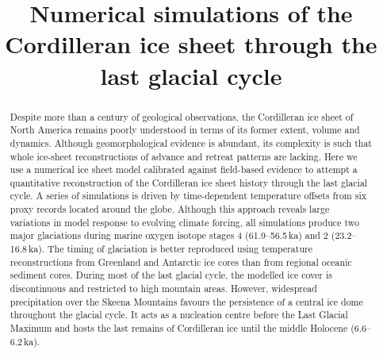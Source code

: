 \documentclass[tc, manuscript]{copernicus}
\begin{document}
\hack{\sloppy}


\title{Numerical simulations of the Cordilleran ice sheet
       through the last glacial cycle}







\hack{\allowdisplaybreaks}

\published{}


\maketitle


\begin{abstract}
Despite more than a century of geological observations, the
Cordilleran ice sheet of North America remains poorly understood in
terms of its former extent, volume and dynamics. Although
geomorphological evidence is abundant, its complexity is such that
whole ice-sheet reconstructions of advance and retreat patterns are
lacking. Here we use a numerical ice sheet model calibrated against
field-based evidence to attempt a quantitative reconstruction of the
Cordilleran ice sheet history through the last glacial
cycle. A series of simulations is driven by time-dependent
temperature offsets from six proxy records located around the
globe. Although this approach reveals large variations in model
response to evolving climate forcing, all simulations produce two
major glaciations during marine oxygen isotope stages 4
(61.9--56.5\,\unit{ka}) and 2 (23.2--16.8\,\unit{ka}). The timing of
glaciation is better reproduced using temperature reconstructions
from Greenland and Antarctic ice cores than from regional oceanic
sediment cores. During most of the last glacial cycle, the modelled
ice cover is discontinuous and restricted to high mountain
areas. However, widespread precipitation over the Skeena Mountains
favours the persistence of a central ice dome throughout the glacial
cycle. It acts as a nucleation centre before the Last Glacial
Maximum and hosts the last remains of Cordilleran ice until the
middle Holocene (6.6--6.2\,ka).
\end{abstract}
\end{document}
